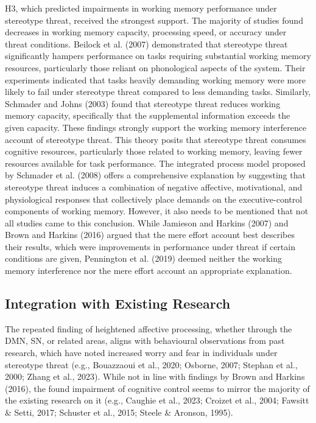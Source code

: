 \documentclass[
  stu, a4paper,floatsintext]{apa7}
\begin{document}
H3, which predicted impairments in working memory performance under stereotype threat, received the strongest support.
The majority of studies found decreases in working memory capacity, processing speed, or accuracy under threat conditions.
Beilock et al. (2007) demonstrated that stereotype threat significantly hampers performance on tasks requiring substantial working memory resources, particularly those reliant on phonological aspects of the system.
Their experiments indicated that tasks heavily demanding working memory were more likely to fail under stereotype threat compared to less demanding tasks.
Similarly, Schmader and Johns (2003) found that stereotype threat reduces working memory capacity, specifically that the supplemental information exceeds the given capacity.
These findings strongly support the working memory interference account of stereotype threat.
This theory posits that stereotype threat consumes cognitive resources, particularly those related to working memory, leaving fewer resources available for task performance.
The integrated process model proposed by Schmader et al. (2008) offers a comprehensive explanation by suggesting that stereotype threat induces a combination of negative affective, motivational, and physiological responses that collectively place demands on the executive-control components of working memory.
However, it also needs to be mentioned that not all studies came to this conclusion.
While Jamieson and Harkins (2007) and Brown and Harkins (2016) argued that the mere effort account best describes their results, which were improvements in performance under threat if certain conditions are given, Pennington et al. (2019) deemed neither the working memory interference nor the mere effort account an appropriate explanation.

\subsection{Integration with Existing Research}\label{integration-with-existing-research}

The repeated finding of heightened affective processing, whether through the DMN, SN, or related areas, aligns with behavioural observations from past research, which have noted increased worry and fear in individuals under stereotype threat (e.g., Bouazzaoui et al., 2020; Osborne, 2007; Stephan et al., 2000; Zhang et al., 2023).
While not in line with findings by Brown and Harkins (2016), the found impairment of cognitive control seems to mirror the majority of the existing research on it (e.g., Caughie et al., 2023; Croizet et al., 2004; Fawsitt \& Setti, 2017; Schuster et al., 2015; Steele \& Aronson, 1995).
\end{document}
